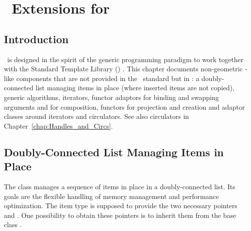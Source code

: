 
\chapter{\stl\ Extensions for \cgal}
\label{chapterDataStructures}\label{chapterStlExtensions}



\section{Introduction}

\cgal\ is designed in the spirit of the generic programming paradigm
to work together with the Standard Template Library (\stl)
\cite{ansi-is14882,a-gps-98}. This chapter documents non-geometric
\stl-like components that are not provided in the \stl\ standard but
in \cgal: a doubly-connected list managing items in place (where
inserted items are not copied), generic algorithms, iterators, functor
adaptors for binding and swapping arguments and for composition,
functors for projection and creation and adaptor classes around
iterators and circulators. See also circulators in
Chapter~\ref{chap:Handles_and_Circs}.

\section{Doubly-Connected List Managing Items in Place}

The class  manages a
sequence of items in place in a doubly-connected list. Its goals are
the flexible handling of memory management and performance
optimization. The item type is supposed to provide the two necessary
pointers  and . One possibility
to obtain these pointers is to inherit them from the base class
.

